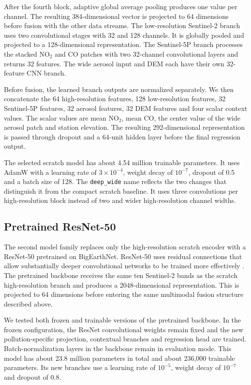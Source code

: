 \documentclass[english, a4paper]{article}
\begin{document}
After the fourth block, adaptive global average pooling produces one value per channel. The resulting 384-dimensional vector is projected to 64 dimensions before fusion with the other data streams. The low-resolution Sentinel-2 branch uses two convolutional stages with 32 and 128 channels. It is globally pooled and projected to a 128-dimensional representation. The Sentinel-5P branch processes the stacked NO$_2$ and CO patches with two 32-channel convolutional layers and returns 32 features. The wide aerosol input and DEM each have their own 32-feature CNN branch.

Before fusion, the learned branch outputs are normalized separately. We then concatenate the 64 high-resolution features, 128 low-resolution features, 32 Sentinel-5P features, 32 aerosol features, 32 DEM features and four scalar context values. The scalar values are mean NO$_2$, mean CO, the center value of the wide aerosol patch and station elevation. The resulting 292-dimensional representation is passed through dropout and a 64-unit hidden layer before the final regression output.

The selected scratch model has about 4.54 million trainable parameters. It uses AdamW with a learning rate of $3\times10^{-4}$, weight decay of $10^{-7}$, dropout of 0.5 and a batch size of 128. The \texttt{deep\_wide} name reflects the two changes that distinguish it from the compact scratch baseline. It uses three convolutions per high-resolution block instead of two and wider high-resolution channel widths.


\subsection{Pretrained ResNet-50}
\label{sec:resnet_model}

The second model family replaces only the high-resolution scratch encoder with a ResNet-50 pretrained on BigEarthNet. ResNet-50 uses residual connections that allow substantially deeper convolutional networks to be trained more effectively \citep{he2015deepresiduallearningimage}. The pretrained backbone receives the same ten Sentinel-2 bands as the scratch high-resolution branch and produces a 2048-dimensional representation. This is projected to 64 dimensions before entering the same multimodal fusion structure described above.

We tested both frozen and trainable versions of the pretrained backbone. In the frozen configuration, the ResNet convolutional weights remain fixed and the new pollution-specific projection, contextual branches and regression head are trained. Batch-normalization layers in the backbone remain in evaluation mode. This model has about 23.8 million parameters in total and about 236,000 trainable parameters. Its new branches use a learning rate of $10^{-5}$, weight decay of $10^{-7}$ and dropout of 0.8.
\end{document}
